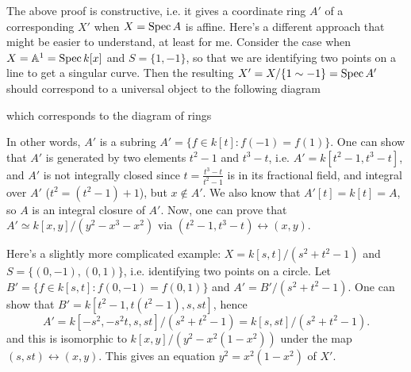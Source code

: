 \documentclass[letterpaper, 12pt]{article}
\begin{document}
The above proof is constructive, i.e. it gives a coordinate ring $A'$ of a corresponding $X'$ when $X = \mathrm{Spec}\, A$ is affine.
Here's a different approach that might be easier to understand, at least for me.
Consider the case when $X = \mathbb{A}^1 = \mathrm{Spec}\, k[x]$ and $S = \{1, -1\}$, so that we are identifying two points on a line to get a singular curve.
Then the resulting $X' = X / \{1 \sim -1\} = \mathrm{Spec}\, A'$ should correspond to a universal object to the following diagram
\begin{center}
\end{center}
which corresponds to the diagram of rings
\begin{center}
\end{center}
In other words, $A'$ is a subring $A' = \{f \in k[t]: f(-1) = f(1)\}$.
One can show that $A'$ is generated by two elements $t^2 - 1$ and $t^3 - t$, i.e. $A' = k[t^2 - 1, t^3 - t]$, and $A'$ is not integrally closed since $t = \frac{t^3 - t}{t^2 - 1}$ is in its fractional field, and integral over $A'$ ($t^2 = (t^2 - 1) + 1$), but $x \not \in A'$. We also know that $A'[t] = k[t] = A$, so $A$ is an integral closure of $A'$.
Now, one can prove that $A' \simeq k[x, y] / (y^2 - x^3 - x^2)$ via $(t^2 - 1, t^3 - t) \leftrightarrow (x, y)$.

Here's a slightly more complicated example: $X = k[s, t] / (s^2 + t^2 - 1)$ and $S = \{(0, -1), (0, 1)\}$, i.e. identifying two points on a circle.
Let $B' = \{f \in k[s, t]: f(0, -1) = f(0, 1)\}$ and $A' = B' / (s^2 + t^2 - 1)$.
One can show that $B' = k[t^2 - 1, t(t^2 - 1), s, st]$, hence
$$
A' = k[-s^2, -s^2 t, s, st] / (s^2 + t^2 - 1) = k[s, st] / (s^2 + t^2 - 1).
$$
and this is isomorphic to $k[x, y] / (y^2 - x^2 (1 - x^2))$ under the map $(s, st) \leftrightarrow (x, y)$.
This gives an equation $y^2 = x^2 (1 - x^2)$ of $X'$.
\end{document}

